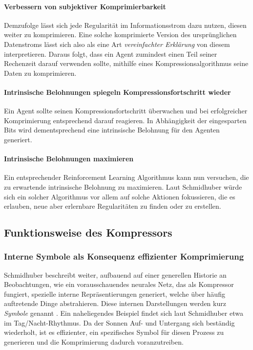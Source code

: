 \paragraph{Verbessern von subjektiver Komprimierbarkeit}
\label{sec:Komprimierbarkeit_verbessern}
Demzufolge lässt sich jede Regularität im Informationsstrom dazu nutzen, diesen weiter zu komprimieren. Eine solche komprimierte Version des ursprünglichen Datenstroms lässt sich also als eine Art \emph{vereinfachter Erklärung} von diesem interpretieren. Daraus folgt, dass ein Agent zumindest einen Teil seiner Rechenzeit darauf verwenden sollte, mithilfe eines Kompressionsalgorithmus seine Daten zu komprimieren.

\paragraph{Intrinsische Belohnungen spiegeln Kompressionsfortschritt wieder}
Ein Agent sollte seinen Kompressionsfortschritt überwachen und bei erfolgreicher Komprimierung entsprechend darauf reagieren. In Abhängigkeit der eingesparten Bits wird dementsprechend eine intrinsische Belohnung für den Agenten generiert.

\paragraph{Intrinsische Belohnungen maximieren}
Ein entsprechender Reinforcement Learning Algorithmus kann nun versuchen, die zu erwartende intrinsische Belohnung zu maximieren. Laut Schmidhuber würde sich ein solcher Algorithmus vor allem auf solche Aktionen fokussieren, die es erlauben, neue aber erlernbare Regularitäten zu finden oder zu erstellen.

\subsection{Funktionsweise des Kompressors}
\label{sec:Kompressor}
\subsubsection{Interne Symbole als Konsequenz effizienter Komprimierung}
Schmidhuber beschreibt weiter, aufbauend auf einer generellen Historie an Beobachtungen, wie ein vorausschauendes neurales Netz, das als Kompressor fungiert, spezielle interne Repräsentierungen generiert, welche über häufig auftretende Dinge abstrahieren. Diese internen Darstellungen werden kurz \emph{Symbole} genannt \cite[p.~6]{curiosity_schmidhuber}. Ein naheliegendes Beispiel findet sich laut Schmidhuber etwa im Tag/Nacht-Rhythmus. Da der Sonnen Auf- und Untergang sich beständig wiederholt, ist es effizienter, ein spezifisches Symbol für diesen Prozess zu generieren und die Komprimierung dadurch voranzutreiben.


